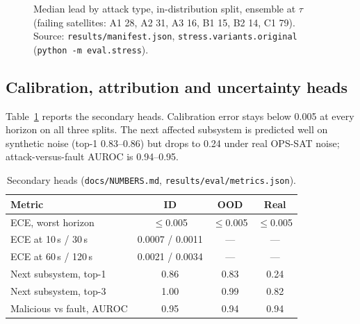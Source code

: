 \documentclass[conference]{IEEEtran}
\newcommand{\file}[1]{\texttt{#1}}
\begin{document}
\begin{figure}[t]
\centering
{}
\caption{Median lead by attack type, in-distribution split, ensemble at $\tau$ (failing satellites:
A1 28, A2 31, A3 16, B1 15, B2 14, C1 79). Source: \file{results/manifest.json}, \texttt{stress.variants.original}
(\texttt{python -m eval.stress}).}
\label{fig:bytype}
\end{figure}

\subsection{Calibration, attribution and uncertainty heads}
Table~\ref{tab:heads} reports the secondary heads. Calibration error stays below 0.005 at every
horizon on all three splits. The next affected subsystem is predicted well on synthetic noise (top-1
0.83--0.86) but drops to 0.24 under real OPS-SAT noise; attack-versus-fault AUROC is 0.94--0.95.

\begin{table}[t]
\caption{Secondary heads (\file{docs/NUMBERS.md}, \file{results/eval/metrics.json}).}
\label{tab:heads}
\centering
\footnotesize
\setlength{\tabcolsep}{4pt}
\renewcommand{\arraystretch}{1.15}
\begin{tabular}{@{}>{\raggedright\arraybackslash}p{40mm}ccc@{}}
\toprule
Metric & ID & OOD & Real \\
\midrule
ECE, worst horizon & $\le$0.005 & $\le$0.005 & $\le$0.005 \\
ECE at 10\,s / 30\,s & 0.0007 / 0.0011 & --- & --- \\
ECE at 60\,s / 120\,s & 0.0021 / 0.0034 & --- & --- \\
Next subsystem, top-1 & 0.86 & 0.83 & 0.24 \\
Next subsystem, top-3 & 1.00 & 0.99 & 0.82 \\
Malicious vs fault, AUROC & 0.95 & 0.94 & 0.94 \\
\bottomrule
\end{tabular}
\end{table}
\end{document}
